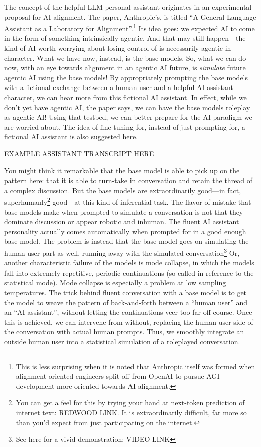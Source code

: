 The concept of the helpful LLM personal assistant originates in an experimental
proposal for AI alignment. The paper, Anthropic's, is titled ``A General
Language Assistant as a Laboratory for
Alignment''\cite{askell2021assistant}.\footnote{This is less surprising when it
is noted that Anthropic itself was formed when alignment-oriented engineers
split off from OpenAI to pursue AGI development more oriented towards AI
alignment.} Its idea goes: we expected AI to come in the form of something
intrinsically agentic. And that may still happen---the kind of AI worth
worrying about losing control of is necessarily agentic in character. What we
have now, instead, is the base models. So, what we can do now, with an eye
towards alignment in an agentic AI future, is \emph{simulate} future agentic AI
using the base models! By appropriately prompting the base models with a
fictional exchange between a human user and a helpful AI assistant character,
we can hear more from this fictional AI assistant. In effect, while we don't
yet have agentic AI, the paper says, we can have the base models roleplay as
agentic AI! Using that testbed, we can better prepare for the AI paradigm we
are worried about. The idea of fine-tuning for, instead of just prompting for,
a fictional AI assistant is also suggested here.

EXAMPLE ASSISTANT TRANSCRIPT HERE

You might think it remarkable that the base model is able to pick up on the
pattern here: that it is able to turn-take in conversation and retain the
thread of a complex discussion. But the base models are extraordinarily
good---in fact, superhumanly\footnote{You can get a feel for this by trying
your hand at next-token prediction of internet text: REDWOOD LINK. It is
extraordinarily difficult, far more so than you'd expect from just
participating on the internet.} good---at this kind of inferential task. The
flavor of mistake that base models make when prompted to simulate a
conversation is not that they dominate discussion or appear robotic and
inhuman. The fluent AI assistant personality actually comes automatically when
prompted for in a good enough base model. The problem is instead that the base
model goes on simulating the human user part as well, running away with the
simulated conversation\footnote{See here for a vivid demonstration: VIDEO LINK}
Or, another characteristic failure of the models is mode collapse, in which the
models fall into extremely repetitive, periodic continuations (so called in
reference to the statistical mode). Mode collapse is especially a problem at
low sampling temperatures. The trick behind fluent conversation with a base
model is to get the model to weave the pattern of back-and-forth between a
``human user'' and an ``AI assistant'', without letting the continuations veer
too far off course. Once this is achieved, we can intervene from without,
replacing the human user side of the conversation with actual human prompts.
Thus, we smoothly integrate an outside human user into a statistical simulation
of a roleplayed conversation.

